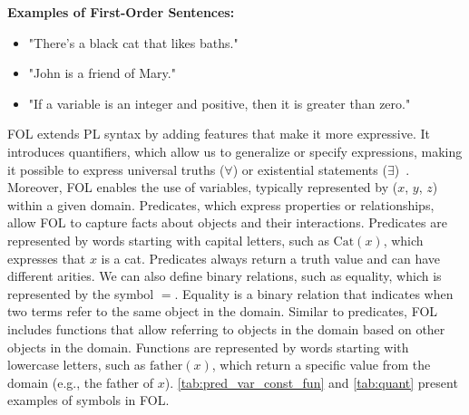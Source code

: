 \textbf{Examples of First-Order Sentences:}
\begin{itemize}
    \renewcommand{\labelitemi}{}  
    \item "There's a black cat that likes baths." 
    \item "John is a friend of Mary." 
    \item "If a variable is an integer and positive, then it is greater than zero." 
\end{itemize}  

\gls{FOL} extends \gls{PL} syntax by adding features that make it more expressive. It introduces quantifiers, which allow us to generalize or specify expressions, making it possible to express universal truths (\(\forall\)) or existential statements (\(\exists\))~\cite{huth_2004_logic}. Moreover, FOL enables the use of variables, typically represented by (\(x\), \(y\), \(z\)) within a given domain. Predicates, which express properties or relationships, allow \gls{FOL} to capture facts about objects and their interactions. Predicates are represented by words starting with capital letters, such as \( \text{Cat}(x) \), which expresses that \( x \) is a cat. Predicates always return a truth value and can have different arities. We can also define binary relations, such as equality, which is represented by the symbol \( = \). Equality is a binary relation that indicates when two terms refer to the same object in the domain. Similar to predicates, \gls{FOL} includes functions that allow referring to objects in the domain based on other objects in the domain. Functions are represented by words starting with lowercase letters, such as \( \text{father}(x) \), which return a specific value from the domain (e.g., the father of \( x \)). \autoref{tab:pred_var_const_fun} and \autoref{tab:quant} present examples of symbols in \gls{FOL}.


\begin{table}[h!]
    \centering
    \caption{Variables, constants, predicates, and functions in First-Order Logic}
    \label{tab:pred_var_const_fun}
\end{table}

